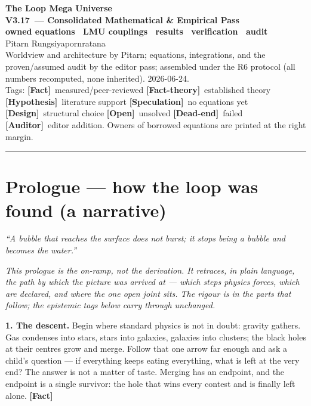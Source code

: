 \documentclass[11pt]{article}
\newcommand{\lmuver}{3.17}
\newcommand{\Fact}{\textbf{\textcolor{green!45!black}{[Fact]}}}
\newcommand{\Hyp}{\textbf{\textcolor{blue!55!black}{[Hypothesis]}}}
\newcommand{\Spec}{\textbf{\textcolor{orange!75!black}{[Speculation]}}}
\newcommand{\Dead}{\textbf{\textcolor{red!65!black}{[Dead-end]}}}
\newcommand{\Design}{\textbf{\textcolor{purple!65!black}{[Design]}}}
\newcommand{\Open}{\textbf{\textcolor{gray!10!black}{[Open]}}}
\newcommand{\Auditor}{\textbf{\textcolor{teal!55!black}{[Auditor]}}}
\newcommand{\factth}{\textcolor{green!40!black}{\textbf{[Fact-theory]}}}
\begin{document}
\begin{center}
{\Huge\bfseries The Loop Mega Universe}\\[4pt]
{\LARGE\bfseries V\lmuver\ --- Consolidated Mathematical \& Empirical Pass}\\[3pt]
{\large\bfseries owned equations \textperiodcentered\ LMU couplings \textperiodcentered\ results \textperiodcentered\ verification \textperiodcentered\ audit}\\[8pt]
{\large Pitarn Rungsiyapornratana}\\[2pt]
{\small Worldview and architecture by Pitarn; equations, integrations, and the proven/assumed audit by the editor pass; assembled under the R6 protocol (all numbers recomputed, none inherited). 2026-06-24.}\\[2pt]
{\small Tags: \Fact\ measured/peer-reviewed \quad \factth\ established theory \quad \Hyp\ literature support \quad \Spec\ no equations yet \quad \Design\ structural choice \quad \Open\ unsolved \quad \Dead\ failed \quad \Auditor\ editor addition. Owners of borrowed equations are printed at the right margin.}
\end{center}
\hrule\vspace{6pt}
\part*{Prologue --- how the loop was found (a narrative)}
\begin{flushright}\small\emph{``A bubble that reaches the surface does not burst; it stops being a bubble and becomes the water.''}\end{flushright}

\noindent\emph{This prologue is the on-ramp, not the derivation. It retraces, in plain language, the path by which the picture was arrived at --- which steps physics forces, which are declared, and where the one open joint sits. The rigour is in the parts that follow; the epistemic tags below carry through unchanged.}

\medskip
\noindent\textbf{1. The descent.} Begin where standard physics is not in doubt: gravity gathers. Gas condenses into stars, stars into galaxies, galaxies into clusters; the black holes at their centres grow and merge. Follow that one arrow far enough and ask a child's question --- if everything keeps eating everything, what is left at the very end? The answer is not a matter of taste. Merging has an endpoint, and the endpoint is a single survivor: the hole that wins every contest and is finally left alone. \Fact
\end{document}
